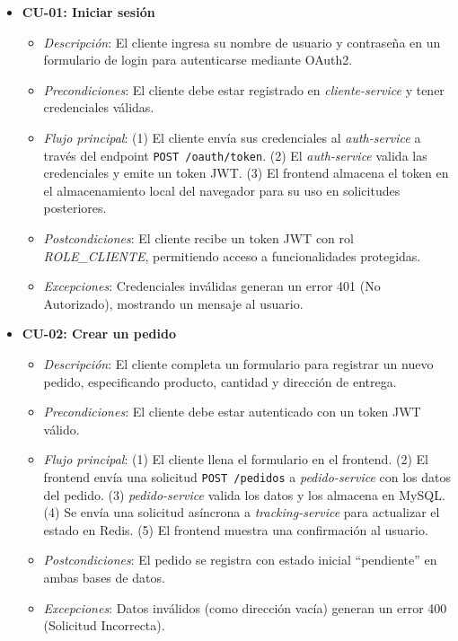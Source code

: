 \documentclass[a4paper,12pt]{article}
\begin{document}
\begin{itemize}
    \item \textbf{CU-01: Iniciar sesión}
    \begin{itemize}
        \item \textit{Descripción}: El cliente ingresa su nombre de usuario y contraseña en un formulario de login para autenticarse mediante OAuth2.
        \item \textit{Precondiciones}: El cliente debe estar registrado en \textit{cliente-service} y tener credenciales válidas.
        \item \textit{Flujo principal}: (1) El cliente envía sus credenciales al \textit{auth-service} a través del endpoint \texttt{POST /oauth/token}. (2) El \textit{auth-service} valida las credenciales y emite un token JWT. (3) El frontend almacena el token en el almacenamiento local del navegador para su uso en solicitudes posteriores.
        \item \textit{Postcondiciones}: El cliente recibe un token JWT con rol \textit{ROLE\_CLIENTE}, permitiendo acceso a funcionalidades protegidas.
        \item \textit{Excepciones}: Credenciales inválidas generan un error 401 (No Autorizado), mostrando un mensaje al usuario.
    \end{itemize}

    \item \textbf{CU-02: Crear un pedido}
    \begin{itemize}
        \item \textit{Descripción}: El cliente completa un formulario para registrar un nuevo pedido, especificando producto, cantidad y dirección de entrega.
        \item \textit{Precondiciones}: El cliente debe estar autenticado con un token JWT válido.
        \item \textit{Flujo principal}: (1) El cliente llena el formulario en el frontend. (2) El frontend envía una solicitud \texttt{POST /pedidos} a \textit{pedido-service} con los datos del pedido. (3) \textit{pedido-service} valida los datos y los almacena en MySQL. (4) Se envía una solicitud asíncrona a \textit{tracking-service} para actualizar el estado en Redis. (5) El frontend muestra una confirmación al usuario.
        \item \textit{Postcondiciones}: El pedido se registra con estado inicial ``pendiente'' en ambas bases de datos.
        \item \textit{Excepciones}: Datos inválidos (como dirección vacía) generan un error 400 (Solicitud Incorrecta).
    \end{itemize}


\end{itemize}
\end{document}
